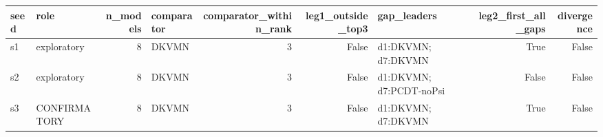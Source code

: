 \begin{tabular}{llrlrrlrr}
\toprule
seed & role & n\_models & comparator & comparator\_within\_rank & leg1\_outside\_top3 & gap\_leaders & leg2\_first\_all\_gaps & divergence \\
\midrule
s1 & exploratory & 8 & DKVMN & 3 & False & d1:DKVMN; d7:DKVMN & True & False \\
s2 & exploratory & 8 & DKVMN & 3 & False & d1:DKVMN; d7:PCDT-noPsi & False & False \\
s3 & CONFIRMATORY & 8 & DKVMN & 3 & False & d1:DKVMN; d7:DKVMN & True & False \\
\bottomrule
\end{tabular}
